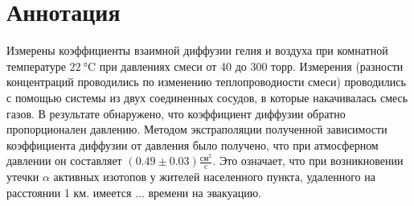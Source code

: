 \section*{Аннотация}

 Измерены коэффициенты взаимной диффузии гелия и воздуха при комнатной температуре $\SI{22}{\celsius}$ при давлениях смеси от 40 до 300 торр. Измерения (разности концентраций проводились по изменению теплопроводности смеси) проводились с помощью системы из двух соединенных сосудов, в которые накачивалась смесь газов. В результате обнаружено, что коэффициент диффузии обратно пропорционален давлению. Методом экстраполяции полученной зависимости коэффициента диффузии от давления было получено, что при атмосферном давлении он составляет $(0.49 \pm 0.03)\frac{{\text{см}}^2}{\text{c}}$. Это означает, что при возникновении утечки $\alpha$ активных изотопов у жителей населенного пункта, удаленного на расстоянии 1 км. имеется ... времени на эвакуацию. 